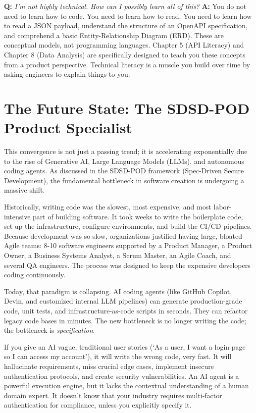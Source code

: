 \documentclass[
  11pt,
  openany,
  oneside]{book}
\begin{document}
\textbf{Q:} \emph{I'm not highly technical. How can I possibly learn all
of this?} \textbf{A:} You do not need to learn how to code. You need to
learn how to read. You need to learn how to read a JSON payload,
understand the structure of an OpenAPI specification, and comprehend a
basic Entity-Relationship Diagram (ERD). These are conceptual models,
not programming languages. Chapter 5 (API Literacy) and Chapter 8 (Data
Analysis) are specifically designed to teach you these concepts from a
product perspective. Technical literacy is a muscle you build over time
by asking engineers to explain things to you.

\section{The Future State: The SDSD-POD Product
Specialist}\label{the-future-state-the-sdsd-pod-product-specialist}

This convergence is not just a passing trend; it is accelerating
exponentially due to the rise of Generative AI, Large Language Models
(LLMs), and autonomous coding agents. As discussed in the SDSD-POD
framework (Spec-Driven Secure Development), the fundamental bottleneck
in software creation is undergoing a massive shift.

Historically, writing code was the slowest, most expensive, and most
labor-intensive part of building software. It took weeks to write the
boilerplate code, set up the infrastructure, configure environments, and
build the CI/CD pipelines. Because development was so slow,
organizations justified having large, bloated Agile teams: 8-10 software
engineers supported by a Product Manager, a Product Owner, a Business
Systems Analyst, a Scrum Master, an Agile Coach, and several QA
engineers. The process was designed to keep the expensive developers
coding continuously.

Today, that paradigm is collapsing. AI coding agents (like GitHub
Copilot, Devin, and customized internal LLM pipelines) can generate
production-grade code, unit tests, and infrastructure-as-code scripts in
seconds. They can refactor legacy code bases in minutes. The new
bottleneck is no longer writing the code; the bottleneck is
\emph{specification}.

If you give an AI vague, traditional user stories (`As a user, I want a
login page so I can access my account'), it will write the wrong code,
very fast. It will hallucinate requirements, miss crucial edge cases,
implement insecure authentication protocols, and create security
vulnerabilities. An AI agent is a powerful execution engine, but it
lacks the contextual understanding of a human domain expert. It doesn't
know that your industry requires multi-factor authentication for
compliance, unless you explicitly specify it.
\end{document}
